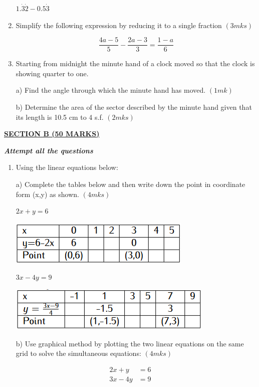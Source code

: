 \documentclass[
  a4paperpaper,
]{scrbook}
\begin{document}
\begin{tcolorbox}
\begin{enumerate}
  \(1.\dot{3}\dot{2}-0.5\dot{3}\)
\item
  Simplify the following expression by reducing it to a single fraction
  \((3mks)\)

  \[\frac{4a-5}{5}-\frac{2a-3}{3}=\frac{1-a}{6}\]
\item
  Starting from midnight the minute hand of a clock moved so that the
  clock is showing quarter to one.

  a) Find the angle through which the minute hand has moved. \((1mk)\)

  b) Determine the area of the sector described by the minute hand given
  that its length is 10.5 cm to 4 s.f. \((2mks)\)
\end{enumerate}

\ul{\textbf{SECTION B (50 MARKS)}}

\textbf{\emph{Attempt all the questions}}

\begin{enumerate}
\def\labelenumi{\arabic{enumi}.}
\setcounter{enumi}{16}
\item
  Using the linear equations below:

  a) Complete the tables below and then write down the point in
  coordinate form (x,y) as shown. \((4mks)\)

  \(2x+y=6\)

  \includegraphics{figures/Md5_Q17a.png}

  \(3x-4y=9\)

  \includegraphics{figures/Md5_Q17b.png}

  b) Use graphical method by plotting the two linear equations on the
  same grid to solve the simultaneous equations: \((4mks)\)
\end{enumerate}

\begin{equation}
\begin{split}
2x+y&=6\\
3x-4y&=9
\end{split}
\end{equation}


\end{tcolorbox}
\end{document}
